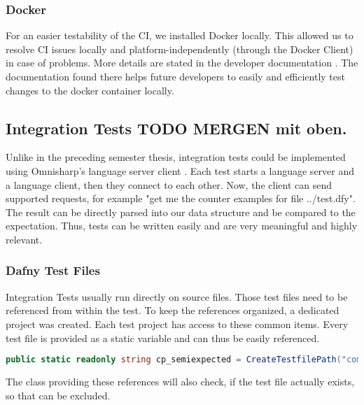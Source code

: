 {{\subsubsection{Docker}
For an easier testability of the CI, we installed Docker locally.
This allowed us to resolve CI issues locally and platform-independently (through the Docker Client) in case of problems.
More details are stated in the developer documentation \cite{dev}.
The documentation found there helps future developers to easily and efficiently test changes to the docker container locally. \\

\subsection{Integration Tests TODO MERGEN mit oben.}

\label{chapter:designTests}
Unlike in the preceding semester thesis, integration tests could be implemented using Omnisharp's language server client \cite{omnisharpClient}.
Each test starts a language server and a language client, then they connect to each other.
Now, the client can send supported requests, for example "get me the counter examples for file ../test.dfy".
The result can be directly parsed into our  data structure and be compared to the expectation.
Thus, tests can be written easily and are very meaningful and highly relevant.

\subsubsection{Dafny Test Files}
Integration Tests usually run directly on  source files.
Those test files need to be referenced from within the test.
To keep the references organized, a dedicated project  was created.
Each test project has access to these common items.
Every test file is provided as a static variable and can thus be easily referenced.

\begin{lstlisting}[language=csharp, caption={Test File Reference}, captionpos=b, label={lst:semiExpectedCodeThing}]
public static readonly string cp_semiexpected = CreateTestfilePath("compile/semi_expected_error.dfy");
\end{lstlisting}
The class providing these references will also check, if the test file actually exists, so that  can be excluded.

}}
